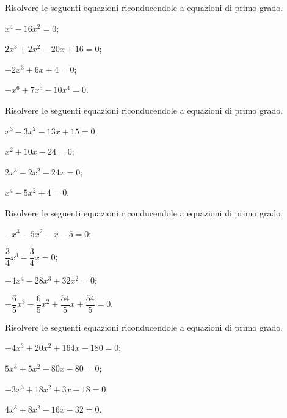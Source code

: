 \begin{esercizio}[\Ast]
\label{ese:20.4}
Risolvere le seguenti equazioni riconducendole a equazioni di primo grado.
\begin{multicols}{2}
\begin{enumeratea}
 \item $x^{4}-16x^{2}=0$;
 \item $2x^{3}+2x^{2}-20x+16=0$;
 \item $-2x^{3}+6x+4=0$;
 \item $-x^{6}+7x^{5}-10x^{4}=0$.
\end{enumeratea}
\end{multicols}
\end{esercizio}

\begin{esercizio}[\Ast]
\label{ese:20.5}
Risolvere le seguenti equazioni riconducendole a equazioni di primo grado.
\begin{multicols}{2}
\begin{enumeratea}
 \item $x^{3}-3x^{2}-13x+15=0$;
 \item $x^{2}+10x-24=0$;
 \item $2x^{3}-2x^{2}-24x=0$;
 \item $x^{4}-5x^{2}+4=0$.
\end{enumeratea}
\end{multicols}
\end{esercizio}

\begin{esercizio}[\Ast]
\label{ese:20.6}
Risolvere le seguenti equazioni riconducendole a equazioni di primo grado.
\begin{multicols}{2}
\begin{enumeratea}
 \item $-x^{3}-5x^{2}-x-5=0$;
 \item $\dfrac{3}{4}x^{3}-\dfrac{3}{4}x=0$;
 \item $-4x^{4}-28x^{3}+32x^{2}=0$;
 \item $-{\dfrac{6}{5}}x^{3}-\dfrac{6}{5}x^{2}+\dfrac{54}{5}x+\dfrac{54}{5}=0$.
\end{enumeratea}
\end{multicols}
\end{esercizio}

\begin{esercizio}[\Ast]
\label{ese:20.7}
Risolvere le seguenti equazioni riconducendole a equazioni di primo grado.
\begin{multicols}{2}
\begin{enumeratea}
 \item $-4x^{3}+20x^{2}+164x-180=0$;
 \item $5x^{3}+5x^{2}-80x-80=0$;
 \item $-3x^{3}+18x^{2}+3x-18=0$;
 \item $4x^{3}+8x^{2}-16x-32=0$.
\end{enumeratea}
\end{multicols}
\end{esercizio}


